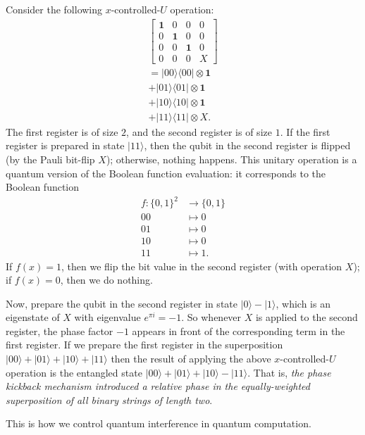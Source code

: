 \documentclass[fleqn]{article}
\newenvironment{idea}{\noindent}{\medskip}
\begin{document}
Consider the following \(x\)-controlled-\(U\) operation:
\[
  \begin{gathered}
    \left[
      \begin{array}{cccc}
        \mathbf{1}& 0 & 0 & 0
      \\0 & \mathbf{1}& 0 & 0
      \\0 & 0 & \mathbf{1}& 0
      \\0 & 0 & 0 & X
      \end{array}
    \right]
  \\[1em]
    =|00\rangle\langle 00|\otimes\mathbf{1}
  \\+ |01\rangle\langle 01|\otimes\mathbf{1}
  \\+ |10\rangle\langle 10|\otimes\mathbf{1}
  \\+ |11\rangle\langle 11|\otimes X.
  \end{gathered}
\]
The first register is of size \(2\), and the second register is of size \(1\).
If the first register is prepared in state \(|11\rangle\), then the qubit in the second register is flipped (by the Pauli bit-flip \(X\)); otherwise, nothing happens.
This unitary operation is a quantum version of the Boolean function evaluation: it corresponds to the Boolean function
\[
  \begin{aligned}
    f\colon\{0,1\}^2 &\to \{0,1\}
  \\00&\mapsto0
  \\01&\mapsto0
  \\10&\mapsto0
  \\11&\mapsto1.
  \end{aligned}
\]
If \(f(x)=1\), then we flip the bit value in the second register (with operation \(X\)); if \(f(x)=0\), then we do nothing.

Now, prepare the qubit in the second register in state \(|0\rangle-|1\rangle\), which is an eigenstate of \(X\) with eigenvalue \(e^{\pi i}=-1\).
So whenever \(X\) is applied to the second register, the phase factor \(-1\) appears in front of the corresponding term in the first register.
If we prepare the first register in the superposition \(|00\rangle+|01\rangle+|10\rangle+|11\rangle\) then the result of applying the above \(x\)-controlled-\(U\) operation is the entangled state \(|00\rangle+|01\rangle+|10\rangle-|11\rangle\).
That is, \emph{the phase kickback mechanism introduced a relative phase in the equally-weighted superposition of all binary strings of length two}.

\begin{idea}

This is how we control quantum interference in quantum computation.

\end{idea}
\end{document}
